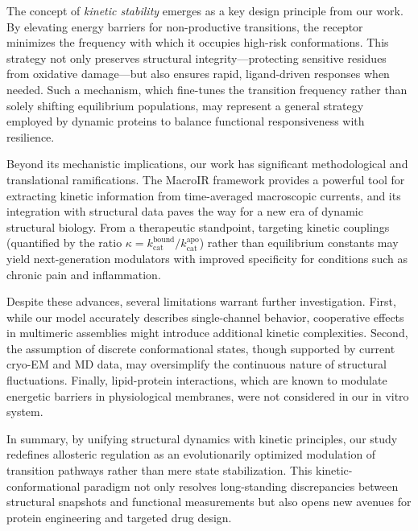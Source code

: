 \documentclass[pdflatex,sn-nature]{sn-jnl}%
\theoremstyle{thmstyleone}%
\theoremstyle{thmstyletwo}%
\theoremstyle{thmstylethree}%
\begin{document}
The concept of \textit{kinetic stability} emerges as a key design principle from our work. By elevating energy barriers for non-productive transitions, the receptor minimizes the frequency with which it occupies high-risk conformations. This strategy not only preserves structural integrity—protecting sensitive residues from oxidative damage—but also ensures rapid, ligand-driven responses when needed. Such a mechanism, which fine-tunes the transition frequency rather than solely shifting equilibrium populations, may represent a general strategy employed by dynamic proteins to balance functional responsiveness with resilience.

Beyond its mechanistic implications, our work has significant methodological and translational ramifications. The MacroIR framework provides a powerful tool for extracting kinetic information from time-averaged macroscopic currents, and its integration with structural data paves the way for a new era of dynamic structural biology. From a therapeutic standpoint, targeting kinetic couplings (quantified by the ratio $\kappa = k_{\text{cat}}^{\text{bound}}/k_{\text{cat}}^{\text{apo}}$) rather than equilibrium constants may yield next-generation modulators with improved specificity for conditions such as chronic pain and inflammation.

Despite these advances, several limitations warrant further investigation. First, while our model accurately describes single-channel behavior, cooperative effects in multimeric assemblies might introduce additional kinetic complexities. Second, the assumption of discrete conformational states, though supported by current cryo-EM and MD data, may oversimplify the continuous nature of structural fluctuations. Finally, lipid-protein interactions, which are known to modulate energetic barriers in physiological membranes, were not considered in our in vitro system.

In summary, by unifying structural dynamics with kinetic principles, our study redefines allosteric regulation as an evolutionarily optimized modulation of transition pathways rather than mere state stabilization. This kinetic-conformational paradigm not only resolves long-standing discrepancies between structural snapshots and functional measurements but also opens new avenues for protein engineering and targeted drug design.


\end{document}
